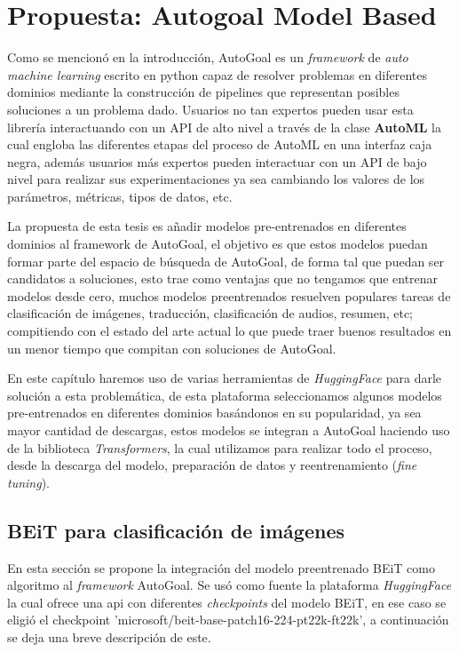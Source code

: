\chapter{Propuesta: Autogoal Model Based}\label{chapter:proposal}

Como se mencionó en la introducción, AutoGoal es un \textit{framework} de \textit{auto machine learning} escrito en python capaz de resolver problemas en diferentes dominios mediante la construcción de pipelines que representan posibles soluciones a un problema dado. Usuarios no tan expertos pueden usar esta librería interactuando con un API de alto nivel a través de la clase \textbf{AutoML} la cual engloba las diferentes etapas del proceso de AutoML en una interfaz caja negra, además usuarios más expertos pueden interactuar con un API de bajo nivel para realizar sus experimentaciones ya sea cambiando los valores de los parámetros, métricas, tipos de datos, etc.

La propuesta de esta tesis es añadir modelos pre-entrenados en diferentes dominios al framework de AutoGoal, el objetivo es que estos modelos puedan formar parte del espacio de búsqueda de AutoGoal, de forma tal que puedan ser candidatos a soluciones, esto trae como ventajas que no tengamos que entrenar modelos desde cero, muchos modelos preentrenados resuelven populares tareas de clasificación de imágenes, traducción, clasificación de audios, resumen, etc; compitiendo con el estado del arte actual lo que puede traer buenos resultados en un menor tiempo que compitan con soluciones de AutoGoal.

En este capítulo haremos uso de varias herramientas de \textit{HuggingFace} para darle solución a esta problemática, de esta plataforma seleccionamos algunos modelos pre-entrenados en diferentes dominios basándonos en su popularidad, ya sea mayor cantidad de descargas, estos modelos se integran a AutoGoal haciendo uso de la biblioteca \textit{Transformers}, la cual utilizamos para realizar todo el proceso, desde la descarga del modelo, preparación de datos y reentrenamiento (\textit{fine tuning}).

\section{BEiT para clasificación de imágenes}
En esta sección se propone la integración del modelo preentrenado BEiT como algoritmo al \textit{framework} AutoGoal. Se usó como fuente la plataforma \textit{HuggingFace} la cual ofrece una api con diferentes \textit{checkpoints} del modelo BEiT, en ese caso se eligió el checkpoint 'microsoft/beit-base-patch16-224-pt22k-ft22k', a continuación se deja una breve descripción de este.

